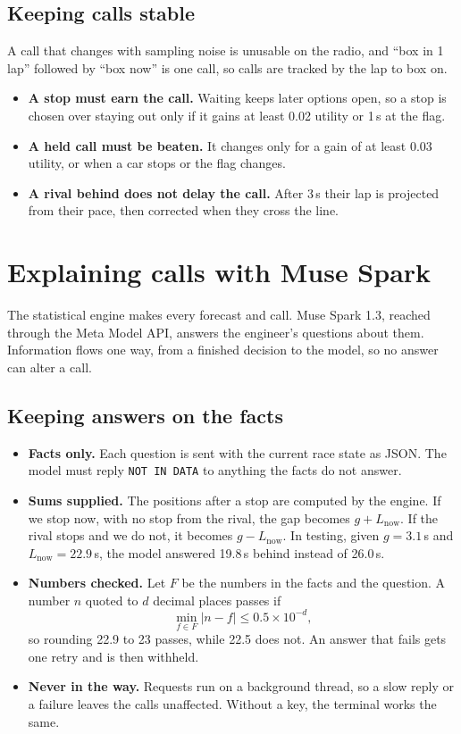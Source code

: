 \documentclass[11pt,a4paper]{article}
\begin{document}
\subsection{Keeping calls stable}
A call that changes with sampling noise is unusable on the radio, and ``box in 1 lap''
followed by ``box now'' is one call, so calls are tracked by the lap to box on.
\begin{itemize}
  \item \textbf{A stop must earn the call.} Waiting keeps later options open, so a stop is
        chosen over staying out only if it gains at least 0.02 utility or 1\,s at the flag.
  \item \textbf{A held call must be beaten.} It changes only for a gain of at least 0.03
        utility, or when a car stops or the flag changes.
  \item \textbf{A rival behind does not delay the call.} After 3\,s their lap is projected
        from their pace, then corrected when they cross the line.
\end{itemize}

\section{Explaining calls with Muse Spark}

The statistical engine makes every forecast and call. Muse Spark 1.3, reached through the Meta
Model API, answers the engineer's questions about them. Information flows one way, from a finished
decision to the model, so no answer can alter a call.

\subsection{Keeping answers on the facts}
\begin{itemize}
  \item \textbf{Facts only.} Each question is sent with the current race state as JSON. The
        model must reply \texttt{NOT IN DATA} to anything the facts do not answer.
  \item \textbf{Sums supplied.} The positions after a stop are computed by the engine. If we
        stop now, with no stop from the rival, the gap becomes $g + L_{\text{now}}$. If the rival
        stops and we do not, it becomes $g - L_{\text{now}}$. In testing, given $g = 3.1$\,s and
        $L_{\text{now}} = 22.9$\,s, the model answered 19.8\,s behind instead of 26.0\,s.
  \item \textbf{Numbers checked.} Let $F$ be the numbers in the facts and the question. A number
        $n$ quoted to $d$ decimal places passes if
        \begin{equation}
        \min_{f \in F} |n - f| \le 0.5 \times 10^{-d},
        \end{equation}
        so rounding 22.9 to 23 passes, while 22.5 does not. An answer that fails gets one retry
        and is then withheld.
  \item \textbf{Never in the way.} Requests run on a background thread, so a slow reply or a
        failure leaves the calls unaffected. Without a key, the terminal works the same.
\end{itemize}
\end{document}
